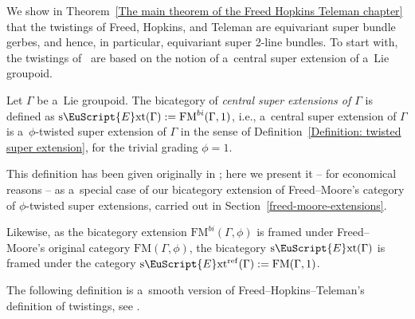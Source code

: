 \documentclass[pdftex]{sigma}
\numberwithin{equation}{section}
\def\mathscr#1{\EuScript{#1}}
\def\sExt{\normalfont\text{s}\mathscr{E}\text{xt}}
\begin{document}
We show in
Theorem~\ref{The main theorem of the Freed Hopkins Teleman chapter} that the twistings of Freed, Hopkins, and Teleman are equivariant super bundle gerbes, and hence, in particular, equivariant super 2-line bundles.
To start with, the twistings of~\cite{Freed2011a} are based on the notion of a~central super extension of a~Lie groupoid.


\begin{Definition} \label{Definition: central super extension}
Let $\Gamma$ be a~Lie groupoid. The bicategory of \emph{central super extensions of $\Gamma$} is defined as
$
\sExt(\Gamma) := \mathrm{FM}^{bi}(\Gamma,1)$,
i.e., a~central super extension of $\Gamma$ is a~$\phi$-twisted super extension of $\Gamma$ in the sense of
 Definition~\ref{Definition: twisted super extension}, for the trivial grading $\phi=1$.
\end{Definition}



This definition has been given originally in \cite[Section~2]{Freed2011a}; here we present it -- for economical reasons -- as a~special case of our bicategory extension of Freed--Moore's category of $\phi$-twisted super extensions, carried out in Section~\ref{freed-moore-extensions}.

\begin{Remark}
\label{sExtref}
Likewise, as the bicategory extension $\mathrm{FM}^{bi}(\Gamma,\phi)$ is framed under Freed--Moore's original category $\mathrm{FM}(\Gamma,\phi)$, the bicategory $\sExt(\Gamma)$ is framed under the category $\sExt^\mathrm{ref}(\Gamma) := \mathrm{FM}(\Gamma,1)$.

\end{Remark}


The following definition is a~smooth version of Freed--Hopkins--Teleman's definition of twistings, see \cite[Section~2.3]{Freed2011a}.
\end{document}

